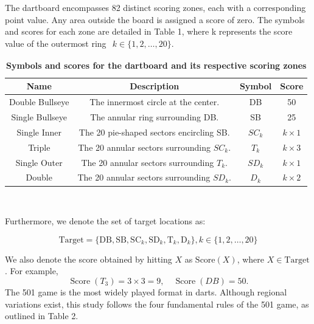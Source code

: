 \documentclass[cjjs]{ipart}
\theoremstyle{plain}
\begin{document}
The dartboard encompasses 82 distinct scoring zones, each with a corresponding point value. Any area outside the board is assigned a score of zero. The symbols and scores for each zone are detailed in Table 1, where k represents the score value of the outermost ring $\begin{aligned}k \in \{1, 2, \dots, 20\}.\end{aligned}$
\begin{table}[h]
    \centering
    \begin{tabular}{|c|c|c|c|}
        \hline
        Name & Description & Symbol & Score \\
        \hline
        Double Bullseye & The innermost circle at the center. & DB & 50 \\
        \hline
        Single Bullseye & The annular ring surrounding DB. & SB & 25 \\
        \hline
        Single Inner & The 20 pie-shaped sectors encircling SB. & \( SC_k \) & \( k \times 1 \) \\
        \hline
        Triple & The 20 annular sectors surrounding \( SC_k \). & \( T_k \) & \( k \times 3 \) \\
        \hline
        Single Outer & The 20 annular sectors surrounding \( T_k \). & \( SD_k \) & \( k \times 1 \) \\
        \hline
        Double & The 20 annular sectors surrounding \( SD_k \). & \( D_k \) & \( k \times 2 \) \\
        \hline
    \end{tabular}\\[1em]
    \caption{\textbf{Symbols and scores for the dartboard and its respective scoring zones}}
\end{table}

Furthermore, we denote the set of target locations as:

\[
\text{Target} = \{ \text{DB}, \text{SB}, \text{SC}_k, \text{SD}_k, \text{T}_k, \text{D}_k \}, k \in \{1, 2, \dots, 20\}
\]

We also denote the score obtained by hitting \( X \) as \( \text{Score}(X) \), where \( X \in \text{Target} \).  
For example, \[
\operatorname{Score}(T_3) = 3 \times 3 = 9, \quad \operatorname{Score}(DB) = 50.
\]
The 501 game is the most widely played format in darts. Although regional variations exist, this study follows the four fundamental rules of the 501 game, as outlined in Table 2.
\end{document}

